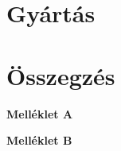 \documentclass[12pt,a4paper,oneside]{report}
\begin{document}
\chapter{Gyártás}

\chapter{Összegzés}



\footnotesize  %


\newpage

\appendix
{}
\begin{center}
    \Large\textbf{Melléklet A}
\end{center}
%
\newpage

\begin{center}
    \Large\textbf{Melléklet B}
\end{center}
\end{document}
